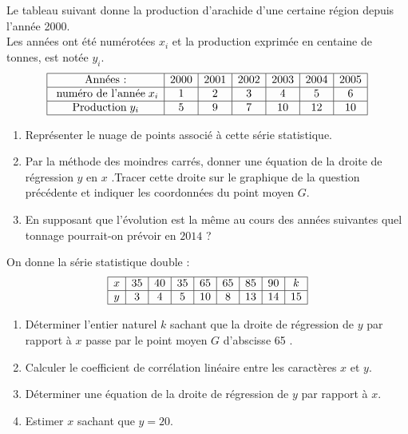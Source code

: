 \begin{exercice}
 Le tableau suivant donne la production d'arachide d'une certaine région depuis l'année 2000.\\
Les années ont été numérotées $ x_{i} $ et la production exprimée en centaine de tonnes,
 est notée $y_{i}$.
$$
\begin{array}{|c|c|c|c|c|c|c|}
\hline
\text{Années :}   & 2000 & 2001 & 2002 & 2003 & 2004 & 2005 \\
\hline
\text{ numéro de l'année} \;  x_{i}   & 1 & 2 & 3 & 4 & 5 & 6 \\
\hline
\text{Production} \; y_{i} & 5 & 9 & 7 & 10 & 12 & 10\\
\hline
\end{array}
$$
\begin{enumerate}
\item Représenter le nuage de points associé à cette série statistique.
\item Par la méthode des moindres carrés, donner une équation de la droite de\\
 régression $y$ en  $x $ .Tracer cette droite sur le graphique de la question  précédente  et indiquer les coordonnées du point moyen $ G $.
 \item En supposant que l'évolution est la même au cours des années suivantes quel tonnage pourrait-on prévoir en $ 2014 $ ?
\end{enumerate}
\end{exercice}
\begin{exercice}
On donne la série statistique double  : 
$$
\begin{array}{|c|c|c|c|c|c|c|c|c|}
\hline
    x & 35 & 40 &  35 &  65 & 65 &  85 & 90 &  k    \\
\hline
  y  & 3 & 4 & 5 & 10 & 8 &  13 &  14 & 15  \\
\hline
\end{array}
$$
\begin{enumerate}
\item Déterminer l'entier naturel $ k $  sachant que la droite de régression de $y$ par rapport à $x$ passe par le point moyen $ G $ d'abscisse 65 .
\item Calculer le coefficient de corrélation linéaire entre les caractères $x$ et $y $.
\item Déterminer une équation  de la droite  de régression de $y$ par rapport à $x$.
\item Estimer $ x $ sachant que $  y= 20 $.
 \end{enumerate}

\end{exercice}
